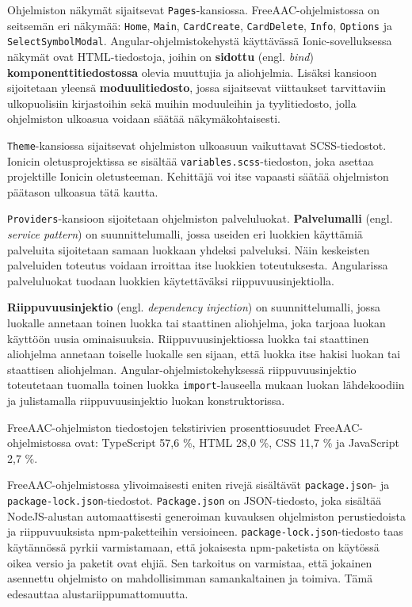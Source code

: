 \documentclass[utf8]{gradu3}
\begin{document}
Ohjelmiston näkymät sijaitsevat \texttt{Pages}-kansiossa. FreeAAC-ohjelmistossa on seitsemän eri näkymää: \texttt{Home}, \texttt{Main}, \texttt{CardCreate}, \texttt{CardDelete}, \texttt{Info}, \texttt{Options} ja \texttt{SelectSymbolModal}. Angular-ohjelmistokehystä käyttävässä Ionic-sovelluksessa näkymät ovat HTML-tiedostoja, joihin on \textbf{sidottu} (engl. \textit{bind}) \textbf{komponenttitiedostossa} olevia muuttujia ja aliohjelmia. Lisäksi kansioon sijoitetaan yleensä \textbf{moduulitiedosto}, jossa sijaitsevat viittaukset tarvittaviin ulkopuolisiin kirjastoihin sekä muihin moduuleihin ja tyylitiedosto, jolla ohjelmiston ulkoasua voidaan säätää näkymäkohtaisesti.

\texttt{Theme}-kansiossa sijaitsevat ohjelmiston ulkoasuun vaikuttavat SCSS-tiedostot. Ionicin oletusprojektissa se sisältää \texttt{variables.scss}-tiedoston, joka asettaa projektille Ionicin oletusteeman. Kehittäjä voi itse vapaasti säätää ohjelmiston päätason ulkoasua tätä kautta.

\texttt{Providers}-kansioon sijoitetaan ohjelmiston palveluluokat. \textbf{Palvelumalli} (engl. \textit{service pattern}) on suunnittelumalli, jossa useiden eri luokkien käyttämiä palveluita sijoitetaan samaan luokkaan yhdeksi palveluksi. Näin keskeisten palveluiden toteutus voidaan irroittaa itse luokkien toteutuksesta. Angularissa palveluluokat tuodaan luokkien käytettäväksi riippuvuusinjektiolla.

\textbf{Riippuvuusinjektio} (engl. \textit{dependency injection}) on suunnittelumalli, jossa luokalle annetaan toinen luokka tai staattinen aliohjelma, joka tarjoaa luokan käyttöön uusia ominaisuuksia. Riippuvuusinjektiossa luokka tai staattinen aliohjelma annetaan toiselle luokalle sen sijaan, että luokka itse hakisi luokan tai staattisen aliohjelman. Angular-ohjelmistokehyksessä riippuvuusinjektio toteutetaan tuomalla toinen luokka \texttt{import}-lauseella mukaan luokan lähdekoodiin ja julistamalla riippuvuusinjektio luokan konstruktorissa.

FreeAAC-ohjelmiston tiedostojen tekstirivien prosenttiosuudet FreeAAC-ohjelmistossa ovat: TypeScript 57,6 \%, HTML 28,0 \%, CSS 11,7 \% ja JavaScript 2,7 \%.

FreeAAC-ohjelmistossa ylivoimaisesti eniten rivejä sisältävät \texttt{package.json}- ja \texttt{package-lock.json}-tiedostot. \texttt{Package.json} on JSON-tiedosto, joka sisältää NodeJS-alustan automaattisesti generoiman kuvauksen ohjelmiston perustiedoista ja riippuvuuksista npm-paketteihin versioineen. \texttt{package-lock.json}-tiedosto taas käytännössä pyrkii varmistamaan, että jokaisesta npm-paketista on käytössä oikea versio ja paketit ovat ehjiä. Sen tarkoitus on varmistaa, että jokainen asennettu ohjelmisto on mahdollisimman samankaltainen ja toimiva. Tämä edesauttaa alustariippumattomuutta.
\end{document}

